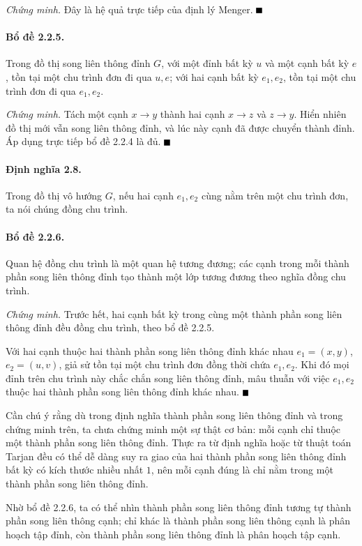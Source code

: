 \documentclass[11pt]{article}
\providecommand{\square}{\mathord{\vcenter{\hrule height .6em width .6em}}}
\begin{document}
\emph{Chứng minh.}
Đây là hệ quả trực tiếp của định lý Menger. \hfill$\square$

\paragraph{Bổ đề 2.2.5.}
Trong đồ thị song liên thông đỉnh $G$, với một đỉnh bất kỳ $u$ và một cạnh bất
kỳ $e$, tồn tại một chu trình đơn đi qua $u,e$; với hai cạnh bất kỳ $e_1,e_2$,
tồn tại một chu trình đơn đi qua $e_1,e_2$.

\emph{Chứng minh.}
Tách một cạnh $x\to y$ thành hai cạnh $x\to z$ và $z\to y$. Hiển nhiên đồ thị
mới vẫn song liên thông đỉnh, và lúc này cạnh đã được chuyển thành đỉnh. Áp dụng
trực tiếp bổ đề 2.2.4 là đủ. \hfill$\square$

\paragraph{Định nghĩa 2.8.}
Trong đồ thị vô hướng $G$, nếu hai cạnh $e_1,e_2$ cùng nằm trên một chu trình
đơn, ta nói chúng đồng chu trình.

\paragraph{Bổ đề 2.2.6.}
Quan hệ đồng chu trình là một quan hệ tương đương; các cạnh trong mỗi thành phần
song liên thông đỉnh tạo thành một lớp tương đương theo nghĩa đồng chu trình.

\emph{Chứng minh.}
Trước hết, hai cạnh bất kỳ trong cùng một thành phần song liên thông đỉnh đều
đồng chu trình, theo bổ đề 2.2.5.

Với hai cạnh thuộc hai thành phần song liên thông đỉnh khác nhau
$e_1=(x,y)$, $e_2=(u,v)$, giả sử tồn tại một chu trình đơn đồng thời chứa
$e_1,e_2$. Khi đó mọi đỉnh trên chu trình này chắc chắn song liên thông đỉnh,
mâu thuẫn với việc $e_1,e_2$ thuộc hai thành phần song liên thông đỉnh khác
nhau. \hfill$\square$

Cần chú ý rằng dù trong định nghĩa thành phần song liên thông đỉnh và trong
chứng minh trên, ta chưa chứng minh một sự thật cơ bản: mỗi cạnh chỉ thuộc một
thành phần song liên thông đỉnh. Thực ra từ định nghĩa hoặc từ thuật toán Tarjan
đều có thể dễ dàng suy ra giao của hai thành phần song liên thông đỉnh bất kỳ có
kích thước nhiều nhất $1$, nên mỗi cạnh đúng là chỉ nằm trong một thành phần
song liên thông đỉnh.

Nhờ bổ đề 2.2.6, ta có thể nhìn thành phần song liên thông đỉnh tương tự thành
phần song liên thông cạnh; chỉ khác là thành phần song liên thông cạnh là phân
hoạch tập đỉnh, còn thành phần song liên thông đỉnh là phân hoạch tập cạnh.
\end{document}
